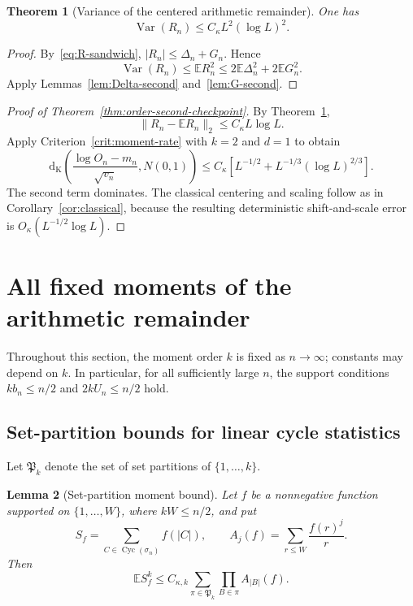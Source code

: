\documentclass[11pt]{article}
\newtheorem{theorem}{Theorem}[section]
\newtheorem{lemma}[theorem]{Lemma}
\theoremstyle{remark}
\newcommand{\Ee}{\mathbb E}
\newcommand{\Var}{\operatorname{Var}}
\newcommand{\Kol}{\mathrm d_{\mathrm K}}
\newcommand{\Cyc}{\operatorname{Cyc}}
\begin{document}
\begin{theorem}[Variance of the centered arithmetic remainder]
\label{thm:R-variance}
One has
\begin{equation}
\label{eq:R-variance}
 \Var(R_n)\le C_\kappa L^2(\log L)^2.
\end{equation}
\end{theorem}

\begin{proof}
By~\eqref{eq:R-sandwich},
$|R_n|\le\Delta_n+G_n$.  Hence
\[
 \Var(R_n)\le\Ee R_n^2
 \le2\Ee\Delta_n^2+2\Ee G_n^2.
\]
Apply Lemmas~\ref{lem:Delta-second} and~\ref{lem:G-second}.
\end{proof}

\begin{proof}[Proof of Theorem~\ref{thm:order-second-checkpoint}]
By Theorem~\ref{thm:R-variance},
\[
 \|R_n-\Ee R_n\|_2\le C_\kappa L\log L.
\]
Apply Criterion~\ref{crit:moment-rate} with $k=2$ and $d=1$ to obtain
\[
 \Kol\!\left(
 \frac{\log O_n-m_n}{\sqrt{v_n}},N(0,1)\right)
 \le C_\kappa\left[L^{-1/2}
 +L^{-1/3}(\log L)^{2/3}\right].
\]
The second term dominates.  The classical centering and scaling follow as
in Corollary~\ref{cor:classical}, because the resulting deterministic
shift-and-scale error is $O_\kappa(L^{-1/2}\log L)$.
\end{proof}

\section{All fixed moments of the arithmetic remainder}
\label{sec:all-moments}

Throughout this section, the moment order $k$ is fixed as $n\to\infty$;
constants may depend on $k$.  In particular, for all sufficiently large
$n$, the support conditions $kb_n\le n/2$ and $2kU_n\le n/2$ hold.

\subsection{Set-partition bounds for linear cycle statistics}

Let $\mathfrak P_k$ denote the set of set partitions of
$\{1,\ldots,k\}$.

\begin{lemma}[Set-partition moment bound]
\label{lem:set-partition-moment}
Let $f$ be a nonnegative function supported on $\{1,\ldots,W\}$, where
$kW\le n/2$, and put
\[
 S_f=\sum_{C\in\Cyc(\sigma_n)}f(|C|),
 \qquad
 A_j(f)=\sum_{r\le W}\frac{f(r)^j}{r}.
\]
Then
\begin{equation}
\label{eq:set-partition-moment}
 \Ee S_f^k
 \le C_{\kappa,k}
 \sum_{\pi\in\mathfrak P_k}
 \prod_{B\in\pi}A_{|B|}(f).
\end{equation}
\end{lemma}
\end{document}
